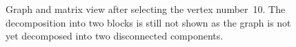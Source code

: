 \documentclass[12pt, oneside]{book}
\begin{document}
\begin{figure}
\centering
{}%
\caption{Graph and matrix view after selecting the vertex number~10. The decomposition into two blocks is still not shown as the graph is not yet decomposed into two disconnected components.}
\label{selected10}
\end{figure}
\end{document}
